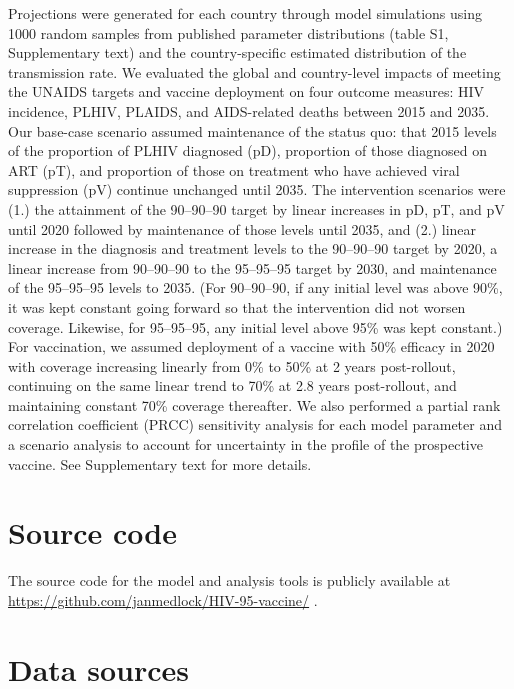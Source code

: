 \documentclass[11pt]{article}
\begin{document}
Projections were generated for each country through model simulations
using 1000 random samples from published parameter distributions
(table S1, Supplementary text) and the country-specific estimated
distribution of the transmission rate. We evaluated the global and
country-level impacts of meeting the UNAIDS targets and vaccine
deployment on four outcome measures: HIV incidence, PLHIV, PLAIDS, and
AIDS-related deaths between 2015 and 2035. Our base-case scenario
assumed maintenance of the status quo: that 2015 levels of the
proportion of PLHIV diagnosed (pD), proportion of those diagnosed on
ART (pT), and proportion of those on treatment who have achieved viral
suppression (pV) continue unchanged until 2035. The intervention
scenarios were (1.) the attainment of the 90–90–90 target by linear
increases in pD, pT, and pV until 2020 followed by maintenance of
those levels until 2035, and (2.) linear increase in the diagnosis and
treatment levels to the 90–90–90 target by 2020, a linear increase
from 90–90–90 to the 95–95–95 target by 2030, and maintenance of the
95–95–95 levels to 2035. (For 90–90–90, if any initial level was above
90\%, it was kept constant going forward so that the intervention did
not worsen coverage.  Likewise, for 95–95–95, any initial level above
95\% was kept constant.)  For vaccination, we assumed deployment of a
vaccine with 50\% efficacy in 2020 with coverage increasing linearly
from 0\% to 50\% at 2 years post-rollout, continuing on the same
linear trend to 70\% at 2.8 years post-rollout, and maintaining
constant 70\% coverage thereafter. We also performed a partial rank
correlation coefficient (PRCC) sensitivity analysis for each model
parameter and a scenario analysis to account for uncertainty in the
profile of the prospective vaccine. See Supplementary text for more
details.


\section{Source code}

The source code for the model and analysis tools is publicly available
at \url{https://github.com/janmedlock/HIV-95-vaccine/}
\cite{medlock2016-git}.


\section{Data sources}
\end{document}
